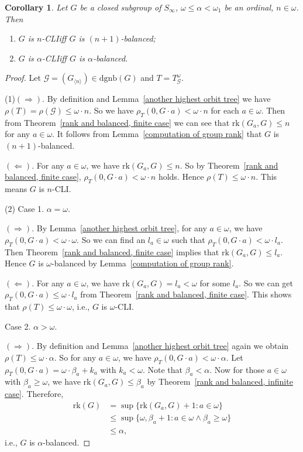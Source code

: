 \documentclass[11pt]{amsart}
\newtheorem{corollary}[theorem]{Corollary}
\theoremstyle{definition}
\theoremstyle{remark}
\numberwithin{equation}{section}
\def\dgnb{{\mathrm{dgnb}}}
\def\gnb#1{G_{\langle #1\rangle}}
\def\hier#1{$#1$-CLI}
\def\otr#1#2{T_{\mathcal{#1}}^{#2}}
\def\rk{\mathrm{rk}}
\begin{document}
\begin{corollary}
    Let $G$ be a closed subgroup of $S_\infty$,  $\omega\leq\alpha<\omega_1$ be an ordinal, $n\in\omega$. Then
    \begin{enumerate}
        \item[(1)] $G$ is \hier{n}\space iff $G$ is $(n+1)$-balanced;
        \item[(2)] $G$ is \hier\alpha\space iff $G$ is $\alpha$-balanced.
    \end{enumerate}
\end{corollary}
\begin{proof}
Let $\mathcal{G}=(\gnb{n})\in\dgnb(G)$ and $T=\otr{G}{\omega}$.

(1)$(\Rightarrow)$. By definition and Lemma~\ref{another highest orbit tree} we have $\rho(T)=\rho(\mathcal{G})\leq\omega\cdot n$. So we have $\rho_T(0,G\cdot a)<\omega\cdot n$ for each $a\in\omega$. Then from Theorem~\ref{rank and balanced, finite case} we can see that $\rk(G_a,G)\leq n$ for any $a\in\omega$. It follows from Lemma~\ref{computation of group rank} that $G$ is $(n+1)$-balanced.

$(\Leftarrow)$. For any $a\in\omega$, we have $\rk(G_a,G)\leq n$. So by Theorem~\ref{rank and balanced, finite case}, $\rho_T(0,G\cdot a)<\omega\cdot n$ holds. Hence $\rho(T)\leq\omega\cdot n$. This means $G$ is \hier n.

(2) Case 1. $\alpha=\omega$.

$(\Rightarrow)$. By Lemma~\ref{another highest orbit tree}, for any $a\in\omega$, we have $\rho_T(0,G\cdot a)<\omega\cdot\omega$. So we can find an $l_a\in\omega$ such that $\rho_T(0,G\cdot a)<\omega\cdot l_a$. Then Theorem~\ref{rank and balanced, finite case} implies that $\rk(G_a,G)\leq l_a$. Hence $G$ is $\omega$-balanced by Lemma~\ref{computation of group rank}.

$(\Leftarrow)$. For any $a\in\omega$, we have $\rk(G_a,G)=l_a<\omega$ for some $l_a$. So we can get $\rho_T(0,G\cdot a)\leq\omega\cdot l_a$ from Theorem~\ref{rank and balanced, finite case}. This shows that $\rho(T)\leq\omega\cdot\omega$, i.e., $G$ is \hier\omega.

Case 2. $\alpha>\omega$.

$(\Rightarrow)$. By definition and Lemma~\ref{another highest orbit tree} again we obtain $\rho(T)\leq\omega\cdot\alpha$. So for any $a\in\omega$, we have $\rho_T(0,G\cdot a)<\omega\cdot\alpha$. Let $\rho_T(0,G\cdot a)=\omega\cdot\beta_a+k_a$ with $k_a<\omega$. Note that $\beta_a<\alpha$. Now for those $a\in\omega$ with $\beta_a\geq\omega$, we have $\rk(G_a,G)\leq\beta_a$ by Theorem~\ref{rank and balanced, infinite case}. Therefore,
\begin{align*}
    \rk(G)&=\sup\{\rk(G_a,G)+1:a\in\omega\}\\
    &\leq\sup\{\omega,\beta_a+1:a\in\omega\land\beta_a\geq\omega\}\\
    &\leq\alpha,
\end{align*}
i.e., $G$ is $\alpha$-balanced.


\end{proof}
\end{document}
